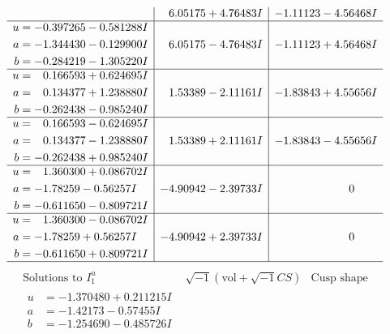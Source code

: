 \documentclass[1p]{elsarticle_modified}
\theoremstyle{definition}
\newcommand{\I}{\sqrt{-1}}
\begin{document}
$$\begin{array}{c|c|c}
 & \phantom{-}6.05175 + 4.76483 I & -1.11123 - 4.56468 I \\ \hline\begin{aligned}
u &= -0.397265 - 0.581288 I \\
a &= -1.344430 - 0.129900 I \\
b &= -0.284219 - 1.305220 I\end{aligned}
 & \phantom{-}6.05175 - 4.76483 I & -1.11123 + 4.56468 I \\ \hline\begin{aligned}
u &= \phantom{-}0.166593 + 0.624695 I \\
a &= \phantom{-}0.134377 + 1.238880 I \\
b &= -0.262438 - 0.985240 I\end{aligned}
 & \phantom{-}1.53389 - 2.11161 I & -1.83843 + 4.55656 I \\ \hline\begin{aligned}
u &= \phantom{-}0.166593 - 0.624695 I \\
a &= \phantom{-}0.134377 - 1.238880 I \\
b &= -0.262438 + 0.985240 I\end{aligned}
 & \phantom{-}1.53389 + 2.11161 I & -1.83843 - 4.55656 I \\ \hline\begin{aligned}
u &= \phantom{-}1.360300 + 0.086702 I \\
a &= -1.78259 - 0.56257 I \\
b &= -0.611650 - 0.809721 I\end{aligned}
 & -4.90942 - 2.39733 I & \phantom{-0.000000 } 0 \\ \hline\begin{aligned}
u &= \phantom{-}1.360300 - 0.086702 I \\
a &= -1.78259 + 0.56257 I \\
b &= -0.611650 + 0.809721 I\end{aligned}
 & -4.90942 + 2.39733 I & \phantom{-0.000000 } 0\\
 \hline 
 \end{array}$$\newpage$$\begin{array}{c|c|c}  
\text{Solutions to }I^u_{1}& \I (\text{vol} + \sqrt{-1}CS) & \text{Cusp shape}\\
 \hline 
\begin{aligned}
u &= -1.370480 + 0.211215 I \\
a &= -1.42173 - 0.57455 I \\
b &= -1.254690 - 0.485726 I\end{aligned}

\end{array}$$
\end{document}
